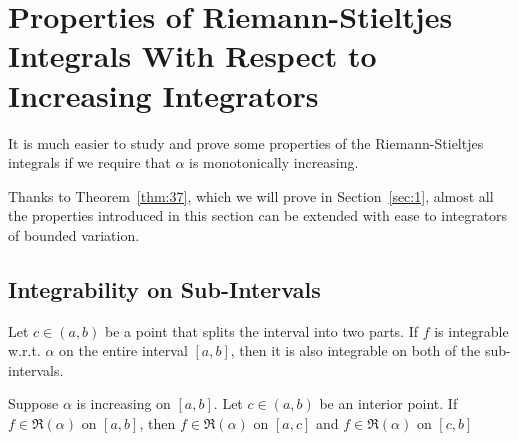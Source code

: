 \documentclass[thmcnt=section, 12pt]{my-elegantbook}
\begin{document}

\section{Properties of Riemann-Stieltjes Integrals With Respect to Increasing Integrators}

It is much easier to study and prove some properties of the Riemann-Stieltjes integrals if we require that $\alpha$ is monotonically increasing.

Thanks to Theorem~\ref{thm:37}, which we will prove in Section~\ref{sec:1}, almost all the properties introduced in this section can be extended with ease to integrators of bounded variation.


\subsection{Integrability on Sub-Intervals}

Let $c \in (a, b)$ be a point that splits the interval into two parts. If $f$ is integrable w.r.t. $\alpha$ on the entire interval $[a, b]$, then it is also integrable on both of the sub-intervals.

\begin{lemma} \label{lem:3}
    Suppose $\alpha$ is increasing on $[a, b]$. Let $c \in (a, b)$ be an interior point. If $f \in \mathfrak{R}(\alpha)$ on $[a, b]$, then $f \in \mathfrak{R}(\alpha)$ on $[a, c]$ and $f \in \mathfrak{R}(\alpha)$ on $[c, b]$
\end{lemma}
\end{document}
